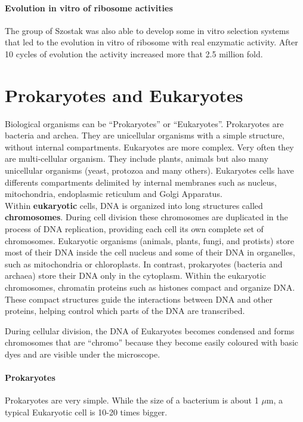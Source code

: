 \paragraph*{Evolution in vitro of ribosome activities}
The group of Szostak was also able to develop some in vitro selection systems
that led to the evolution in vitro of ribosome with real enzymatic activity.
After 10 cycles of evolution the activity increased more that 2.5 million fold.

\section{Prokaryotes and Eukaryotes}

Biological organisms can be ``Prokaryotes'' or ``Eukaryotes''. Prokaryotes are
bacteria and archea. They are unicellular organisms with a simple structure,
without internal compartments. Eukaryotes are more complex. Very often they are
multi-cellular organism. They include plants, animals but also many unicellular
organisms (yeast, protozoa and many others). Eukaryotes cells have differents
compartments delimited by internal membranes such as nucleus, mitochondria,
endoplasmic reticulum and Golgi Apparatus.\\

Within \textbf{eukaryotic} cells, DNA is organized into long structures called 
\textbf{chromosomes}. 
During cell division these chromosomes are duplicated in the process of DNA 
replication, providing each cell its own complete set of chromosomes. 
Eukaryotic organisms (animals, plants, fungi, and protists) store most of 
their DNA inside the cell nucleus and some of their DNA in organelles, such as 
mitochondria or chloroplasts.
In contrast, prokaryotes (bacteria and archaea) store their DNA only in the 
cytoplasm. 
Within the eukaryotic chromosomes, chromatin proteins such as histones compact 
and organize DNA. 
These compact structures guide the interactions between DNA and other proteins, 
helping control which parts of the DNA are transcribed.

During cellular division, the DNA
of Eukaryotes becomes condensed and forms chromosomes that are ``chromo''
because they become easily coloured with basic dyes and are visible under the
microscope.

\paragraph*{Prokaryotes} Prokaryotes are very simple. While the size of a
bacterium is about 1 $\mu$m, a typical Eukaryotic cell is 10-20 times bigger.

